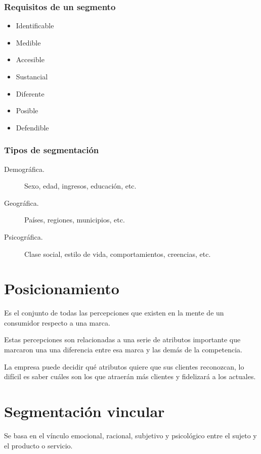 \documentclass[12pt, spanish, a5paper]{article}
\begin{document}
\subsubsection{Requisitos de un segmento}
\begin{itemize}
	\item Identificable
	\item Medible
	\item Accesible
	\item Sustancial
	\item Diferente
	\item Posible
	\item Defendible
\end{itemize}

\subsubsection{Tipos de segmentación}

\begin{description}
	\item[Demográfica.] Sexo, edad, ingresos, educación, etc.
	\item[Geográfica.] Países, regiones, municipios, etc.
	\item[Psicográfica.] Clase social, estilo de vida, comportamientos, creencias, etc.
\end{description}

\section{Posicionamiento}

Es el conjunto de todas las percepciones que existen en la mente de un consumidor respecto a una marca.

Estas percepciones son relacionadas a una serie de atributos importante que marcaron una una diferencia entre esa marca y las demás de la competencia.

La empresa puede decidir qué atributos quiere que sus clientes reconozcan, lo difícil es saber cuáles son los que atraerán más clientes y fidelizará a los actuales.

\section{Segmentación vincular}

Se basa en el vínculo emocional, racional, subjetivo y psicológico entre el sujeto y el producto o servicio.
\end{document}
